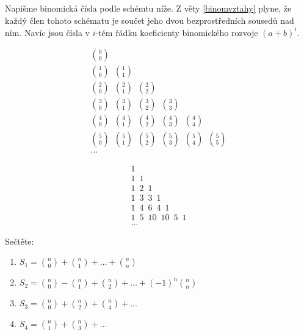 \begin{pozn}
    Napišme binomická čísla podle schémtu níže. Z věty \ref{binomvztahy} plyne,
    že každý člen tohoto schématu je součet jeho dvou bezprostředních sousedů nad ním.
    Navíc jsou čísla v $i$-tém řádku koeficienty binomického rozvoje $(a+b)^i.$

    \begin{minipage}{0.48\textwidth}
        \begin{gather*}
            \binom{0}{0} \\
            \binom{1}{0} \,\,\, \binom{1}{1} \\
            \binom{2}{0} \,\,\, \binom{2}{1} \,\,\, \binom{2}{2} \\
            \binom{3}{0} \,\,\, \binom{3}{1} \,\,\, \binom{3}{2} \,\,\, \binom{3}{3} \\
            \binom{4}{0} \,\,\, \binom{4}{1} \,\,\, \binom{4}{2} \,\,\, \binom{4}{3} \,\,\, \binom{4}{4} \\
            \binom{5}{0} \,\,\, \binom{5}{1} \,\,\, \binom{5}{2} \,\,\, \binom{5}{3} \,\,\, \binom{5}{4} \,\,\, \binom{5}{5} \\
            \dots
        \end{gather*}
    \end{minipage}
    \hfill
    \begin{minipage}{0.48\textwidth}
    \begin{gather*}
        1 \\
        1 \,\,\, 1 \\
        1 \,\,\, 2 \,\,\, 1 \\
        1 \,\,\, 3 \,\,\, 3 \,\,\, 1 \\
        1 \,\,\, 4 \,\,\, 6 \,\,\, 4 \,\,\, 1 \\
        1 \,\,\, 5 \,\,\, 10 \,\,\, 10 \,\,\, 5 \,\,\, 1 \\
        \dots
    \end{gather*}
    \end{minipage}


\end{pozn}

\begin{priklad}
Sečtěte:
\begin{enumerate}[$i$]
\item $S_1 = \binom{n}{0}+\binom{n}{1}+\dots+\binom{n}{n}$
\item $S_2= \binom{n}{0}-\binom{n}{1}+\binom{n}{2}+\dots+(-1)^n\binom{n}{n}$
\item $S_3= \binom{n}{0}+\binom{n}{2}+\binom{n}{4}+\dots$
\item $S_4= \binom{n}{1}+\binom{n}{3}+\dots$
\end{enumerate}
\end{priklad}

